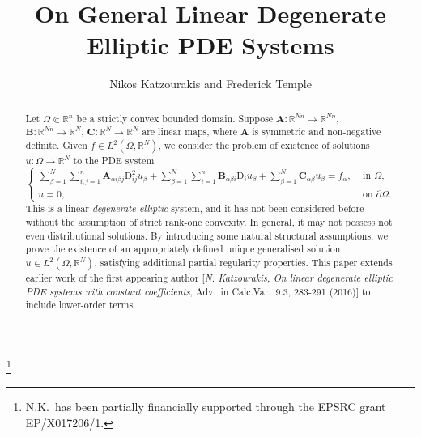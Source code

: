 \documentclass{amsart}
\numberwithin{equation}{section}
\numberwithin{thm}{section}
\theoremstyle{definition}
\renewcommand{\:}{\!:\!} %
\renewcommand{\^}[1]{^{#1}_{\phantom{l}}}
\begin{document}
\title{On General Linear Degenerate Elliptic PDE Systems}


\date{}

\author{Nikos Katzourakis and Frederick Temple}




\address{N.K. (corresponding author) Department of Mathematics and Statistics, University of Reading, Whiteknights Campus, Pepper Lane, Reading RG6 6AX, UNITED KINGDOM}

\address{F.T. Department of Mathematics and Statistics, University of Reading, Whiteknights Campus, Pepper Lane, Reading RG6 6AX, UNITED KINGDOM}

\thanks{N.K.\ has been partially financially supported through the EPSRC grant EP/X017206/1.}

\maketitle

\setcounter{section}{0}
\begin{abstract} 
\noindent
Let $\Omega \Subset \mathbb{R}^{n}$ be a strictly convex bounded domain. Suppose $\mathbf{A} : \mathbb{R}^{Nn} \longrightarrow \mathbb{R}^{Nn}$, $\mathbf{B}: \mathbb{R}^{Nn} \longrightarrow \mathbb{R}^{N}$, $\mathbf{C}: \mathbb{R}^{N} \longrightarrow \mathbb{R}^{N}$ are linear maps, where $\mathbf{A}$ is symmetric and non-negative definite. Given $f \in L^2(\Omega, \mathbb{R}^N)$, we consider the problem of existence of solutions $u: \Omega  \longrightarrow \mathbb{R}^N$ to the PDE system
\[
 \left\{
\begin{array}{rl}
\displaystyle\sum_{\beta = 1}^{N}\sum_{i, j = 1}^{n} \mathbf{A}_{\alpha i \beta j}\mathrm{D}_{ij}^{2}u_{\beta} + \sum_{\beta = 1}^{N} \sum_{i=1}^{n} \mathbf{B}_{\alpha \beta i}\mathrm{D}_{i}u_{\beta} + \sum_{\beta = 1}^{N} \mathbf{C}_{\alpha \beta}u_{\beta} = f_\alpha, &\text{ in $\Omega$},
\\
u = 0,\ \,& \text{ on $\partial \Omega$}.
\end{array} 
\right. 
\]
This is a linear \textit{degenerate elliptic} system, and it has not been considered before without the assumption of strict rank-one convexity. In general, it may not possess not even distributional solutions. By introducing some natural structural assumptions, we prove the existence of an appropriately defined unique generalised solution $u\in L^2(\Omega, \mathbb{R}^N)$, satisfying additional partial regularity properties. This paper extends earlier work of the first appearing author [\textit{N. Katzourakis, On linear degenerate elliptic PDE systems with constant coefficients}, Adv.\ in Calc.Var.\ 9:3, 283-291 (2016)] to include lower-order terms. 
\end{abstract}
\end{document}
